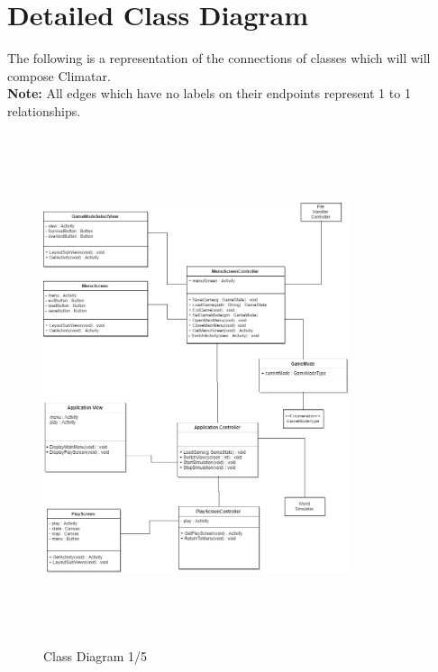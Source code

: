 \documentclass[]{article}
\begin{document}
\pagebreak
\section{Detailed Class Diagram}
\label{sec:detailed_class_diagram}
The following is a representation of the connections of classes which will will compose Climatar. \\
\textbf{Note:} All edges which have no labels on their endpoints represent 1 to 1 relationships.

\begin{figure}[h]
    \centering
    \includegraphics[width=0.8\textwidth , height=15cm, keepaspectratio]{dcdTL}
    \caption{Class Diagram 1/5}
    \label{fig:dcdTL}
\end{figure}
\end{document}
